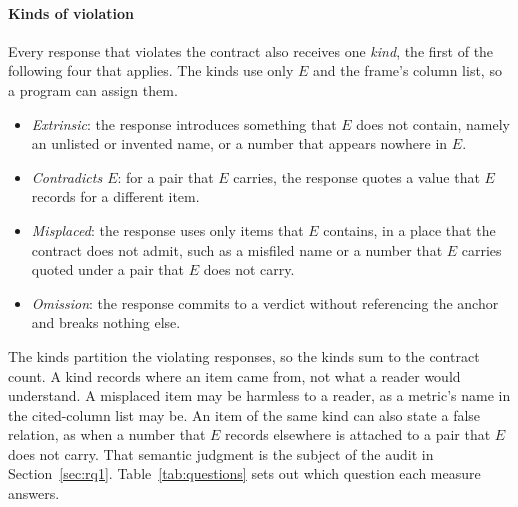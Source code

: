 \documentclass[smallextended,natbib]{svjour3}
\begin{document}
\paragraph{Kinds of violation}
Every response that violates the contract also receives one \emph{kind}, the
first of the following four that applies. The kinds use only $E$ and the
frame's column list, so a program can assign them.
\begin{itemize}
\item \emph{Extrinsic}: the response introduces something that $E$ does not
contain, namely an unlisted or invented name, or a number that appears nowhere
in $E$.
\item \emph{Contradicts $E$}: for a pair that $E$ carries, the response quotes
a value that $E$ records for a different item.
\item \emph{Misplaced}: the response uses only items that $E$ contains, in a
place that the contract does not admit, such as a misfiled name or a number
that $E$ carries quoted under a pair that $E$ does not carry.
\item \emph{Omission}: the response commits to a verdict without referencing
the anchor and breaks nothing else.
\end{itemize}
The kinds partition the violating responses, so the kinds sum to the contract
count. A kind records where an item came from, not what a reader would
understand. A misplaced item may be harmless to a reader, as a metric's name in
the cited-column list may be. An item of the same kind can also state a
false relation, as when a number that $E$ records elsewhere is attached to a
pair that $E$ does not carry. That semantic judgment is the subject of the audit in
Section~\ref{sec:rq1}.
Table~\ref{tab:questions} sets out which question each measure answers.

\begin{table}[!htbp]
\caption{Four questions about a response, and what answers each. The first
two are decided by program for every response; the third needs a reader, and
one validated model judge answers part of the question; the fourth is outside
the study.}
\label{tab:questions}
\centering
\footnotesize
\setlength{\tabcolsep}{3pt}
\end{table}
\end{document}
